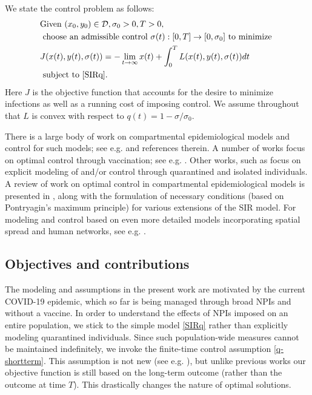 \documentclass[english,12pt,letter]{article}
\newcommand{\Rnot}{\sigma_0}
\newcommand{\dom}{{\mathcal D}}
\begin{document}
We state the control problem as follows:
\begin{align} \label{eq:inf-time-problem}
\begin{aligned}
& \text{Given } (x_0, y_0)\in\dom, \sigma_0>0, T>0,  \\
& \text{ choose an admissible control } \sigma(t): [0,T] \to [0,\Rnot] \text{ to minimize }  \\
&     J(x(t),y(t),\sigma(t)) = -\lim_{t\to\infty} x(t) + \int_0^T L(x(t),y(t),\sigma(t)) dt \\
& \text{ subject to } \eqref{SIRq}.
\end{aligned}
\end{align}
Here $J$ is the objective function that accounts for the desire to
minimize infections as well as a running cost of imposing control.
We assume throughout that $L$ is convex with respect to $q(t)=1-\sigma/\Rnot$.


There is a large body of work on compartmental epidemiological models
and control for such models; see e.g. \cite{hethcote2000mathematics,lenhart2007optimal}
and references therein.  A number of works focus on optimal control
through vaccination; see e.g. \cite{kar2011stability}.
Other works, such as \cite{yan2008optimal,safi2013dynamics,agusto2013optimal}
focus on explicit modeling of and/or control through quarantined and isolated individuals.
A review of work on optimal control in compartmental epidemiological models is
presented in \cite{sharomi2017optimal},
along with the formulation of necessary conditions (based on
Pontryagin's maximum principle) for various extensions of the SIR model.
For modeling and control based on even more detailed models incorporating
spatial spread and human networks, see e.g. \cite{ferguson2005strategies}.

\subsection{Objectives and contributions}

The modeling and assumptions in the present work are motivated by the
current COVID-19 epidemic, which so far is being managed through broad
NPIs and without a vaccine.  In order to understand the effects of NPIs
imposed on an entire population, we stick to the simple model \eqref{SIRq}
rather than explicitly modeling quarantined individuals.
Since such population-wide measures cannot be maintained indefinitely, we
invoke the finite-time control assumption \eqref{q-shortterm}.
This assumption is not new (see e.g. \cite{greenhalgh1988some}),
but unlike previous works our objective function is still based on the
long-term outcome (rather than the outcome at time $T$).
This drastically changes the nature of optimal solutions.
\end{document}
